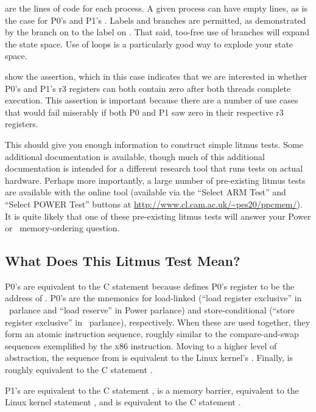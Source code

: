 \begin{fcvref}
 are the lines of code for each process.
A given process can have empty lines, as is the case for P0's
 and P1's .
Labels and branches are permitted, as demonstrated by the branch
on  to the label on .
That said, too-free use of branches
will expand the state space. Use of loops is a particularly good way to
explode your state space.

 show the assertion, which in this case
indicates that we
are interested in whether P0's and P1's r3 registers can both contain
zero after both threads complete execution. This assertion is important
because there are a number of use cases that would fail miserably if
both P0 and P1 saw zero in their respective r3 registers.

This should give you enough information to construct simple litmus
tests. Some additional documentation is available, though much of this
additional documentation is intended for a different research tool that
runs tests on actual hardware. Perhaps more importantly, a large number of
pre-existing litmus tests are available with the online tool (available
via the ``Select ARM Test'' and ``Select POWER Test'' buttons at
\url{http://www.cl.cam.ac.uk/~pes20/ppcmem/}).
It is quite likely that one of these pre-existing litmus tests will
answer your Power or \ARM\ memory-ordering question.

\subsection{What Does This Litmus Test Mean?}
\label{sec:formal:What Does This Litmus Test Mean?}

P0's  are equivalent to the C statement 
because  defines P0's register  to be the address
of . P0's  are the mnemonics for
load-linked (``load register
exclusive'' in \ARM\ parlance and ``load reserve'' in Power parlance)
and store-conditional (``store register exclusive'' in \ARM\ parlance),
respectively. When these are used together, they form an atomic
instruction sequence, roughly similar to the compare-and-swap sequences
exemplified by the x86  instruction. Moving to a higher
level of abstraction, the sequence from 
is equivalent to the Linux kernel's .
Finally,  is
roughly equivalent to the C statement .

P1's  are equivalent to the C statement ,
is a memory barrier, equivalent to the Linux kernel statement ,
and  is equivalent to the C statement .
\end{fcvref}

